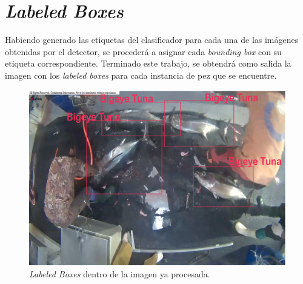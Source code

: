 \section{\textit{Labeled Boxes}}
Habiendo generado las etiquetas del clasificador para cada una de las 
imágenes obtenidas por el detector, se procederá a asignar cada 
\textit{bounding box} con su etiqueta correspondiente. Terminado este 
trabajo, se obtendrá como salida la imagen con los \textit{labeled boxes} 
para cada instancia de pez que se encuentre. 
\begin{figure}[h!]
    \includegraphics[width=1\textwidth]{images/BoundingBox.png}
    \caption{\textit{Labeled Boxes} dentro de la imagen ya procesada. }
    \label{fig:LabelBoxes}
\end{figure}
    